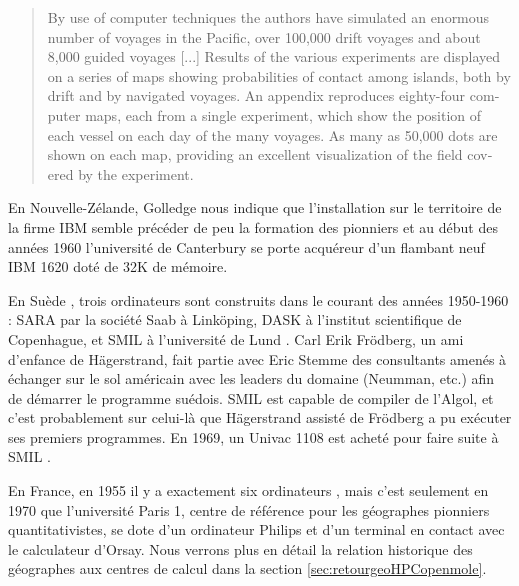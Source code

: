 \foreignblockquote{english}[\cite{Doran1974}]{ By use of computer techniques the authors have simulated an enormous number of voyages in the Pacific, over 100,000 drift voyages and about 8,000 guided voyages [...] Results of the various experiments are displayed on a series of maps showing probabilities of contact among islands, both by drift and by navigated voyages. An appendix reproduces eighty-four computer maps, each from a single experiment, which show the position of each vessel on each day of the many voyages. As many as 50,000 dots are shown on each map, providing an excellent visualization of the field covered by the experiment.}


En Nouvelle-Zélande, Golledge nous indique que l'installation sur le territoire de la firme IBM semble précéder de peu la formation des pionniers \autocite[94]{Bailly2000} et au début des années 1960 l'université de Canterbury se porte acquéreur d'un flambant neuf IBM 1620 doté de 32K de mémoire.


En Suède , trois ordinateurs sont construits dans le courant des années 1950-1960 : SARA par la société Saab à Linköping, DASK à l'institut scientifique de Copenhague, et SMIL à l'université de Lund \autocite{Persson2007}. Carl Erik Frödberg, un ami d'enfance de Hägerstrand, fait partie avec Eric Stemme des consultants amenés à échanger sur le sol américain avec les leaders du domaine (Neumman, etc.) afin de démarrer le programme suédois.  SMIL est capable de compiler de l'Algol, et c'est probablement sur celui-là que Hägerstrand assisté de Frödberg a pu exécuter ses premiers programmes. En 1969, un Univac 1108 est acheté pour faire suite à SMIL \autocite[33-34]{Lindgren2008}.

En France, en 1955 il y a exactement six ordinateurs \autocite[3]{Armatte2008}, mais c'est seulement en 1970 que l'université Paris 1, centre de référence pour les géographes pionniers quantitativistes, se dote d'un ordinateur Philips et d'un terminal en contact avec le calculateur d'Orsay. Nous verrons plus en détail la relation historique des géographes aux centres de calcul dans la section \ref{sec:retourgeoHPCopenmole}.

